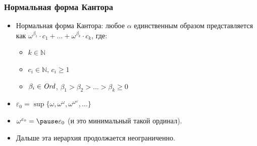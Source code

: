 \documentclass[10pt]{beamer}
\begin{document}
\begin{frame}
    \frametitle{Нормальная форма Кантора}
    \begin{itemize}
        \item Нормальная форма Кантора: любое $\alpha$ единственным образом представляется как $\omega^{\beta_1} \cdot c_1 + \ldots + \omega^{\beta_k} \cdot c_k$, где:
        \begin{itemize}
            \item $k \in \mathbb{N}$
            \item $c_i \in \mathbb{N}$, $c_i \geq 1$
            \item $\beta_i \in \mathit{Ord}$, $\beta_1 > \beta_2 > \ldots > \beta_k \geq 0$
        \end{itemize}
        \pause
        \item $\varepsilon_0 = \sup \{\omega, \omega^\omega, \omega^{\omega^\omega}, \ldots\}$
        \item $\omega^{\varepsilon_0} = \pause \varepsilon_0$ (и это минимальный такой ординал).
        \item Дальше эта иерархия продолжается неограниченно.
    \end{itemize}
\end{frame}
\end{document}
